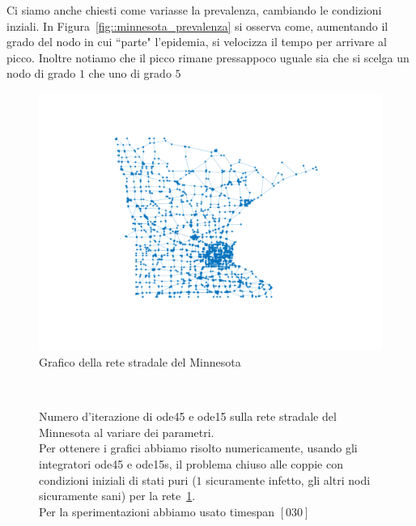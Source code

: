 Ci siamo anche chiesti come variasse la prevalenza, cambiando le condizioni inziali. In Figura~\ref{fig::minnesota_prevalenza} si osserva come, aumentando il grado del nodo in cui ``parte" l'epidemia, si velocizza il tempo per arrivare al picco. Inoltre notiamo che il picco rimane pressappoco uguale sia che si scelga un nodo di grado $1$ che uno di grado $5$ 
\begin{figure}[htb]
\includegraphics[scale=0.8]{Figure/minnesota}
	\caption{Grafico della rete stradale del Minnesota}
	\label{fig::minnesota}
\end{figure}
\begin{figure}[ht]
\centering
\subfloat[][$\gamma=0.10$]
{\resizebox{0.45\textwidth}{!}{}}
 \quad 
\subfloat[][$\gamma=0.30$]
{\resizebox{0.45\textwidth}{!}{ }}
\\
\subfloat[][$\gamma=0.50$]
{\resizebox{0.45\textwidth}{!}
{}}
\quad
\subfloat[][$\gamma=0.70$]
{\resizebox{0.45\textwidth}{!}
{}
}
\caption[Numero d'iterazione di ode45 e ode15  sulla rete stradale del Minnesota al variare dei parametri]{Numero d'iterazione di ode45 e ode15  sulla rete stradale del Minnesota al variare dei parametri.\\Per ottenere i grafici abbiamo risolto numericamente,  usando gli integratori ode45 e ode15s,  il problema chiuso alle coppie con condizioni iniziali  di stati puri ($1$ sicuramente infetto, gli altri nodi sicuramente sani) per la rete~\ref{fig::minnesota}.\\
Per la sperimentazioni abbiamo usato timespan $[0 30]$}
\label{fig::minnesota_lenght}
\end{figure}
